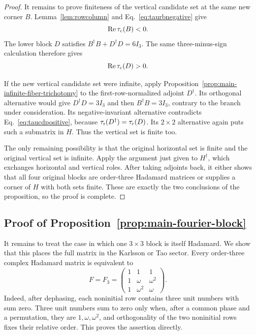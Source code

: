 \begin{proof}
It remains to prove finiteness of the vertical candidate set at the same new corner $B$.  Lemma~\ref{lem:rowcolumn} and Eq.~\eqref{eq:taurbnegative} give
\begin{equation}
\operatorname{Re}\tau_{\rm c}(B)<0.
\label{eq:taucbnegative}
\end{equation}
The lower block $D$ satisfies $B^{\dagger}B+D^{\dagger}D=6I_3$.  The same three-minus-sign calculation therefore gives
\begin{equation}
\operatorname{Re}\tau_{\rm c}(D)>0.
\label{eq:taucdpositive}
\end{equation}

If the new vertical candidate set were infinite, apply Proposition~\ref{prop:main-infinite-fiber-trichotomy} to the first-row-normalized adjoint $D^{\dagger}$. Its orthogonal alternative would give $D^{\dagger}D=3I_3$ and then $B^{\dagger}B=3I_3$, contrary to the branch under consideration.  Its negative-invariant alternative contradicts Eq.~\eqref{eq:taucdpositive}, because $\tau_{\rm r}(D^{\dagger})=\tau_{\rm c}(D)$.  Its $2\times2$ alternative again puts such a submatrix in $H$.  Thus the vertical set is finite too.

The only remaining possibility is that the original horizontal set is finite and the original vertical set is infinite.  Apply the argument just given to $H^{\dagger}$, which exchanges horizontal and vertical roles.  After taking adjoints back, it either shows that all four original blocks are order-three Hadamard matrices or supplies a corner of $H$ with both sets finite. These are exactly the two conclusions of the proposition, so the proof is complete.
\end{proof}

\subsection{{Proof of Proposition~\ref{prop:main-fourier-block}}}
\label{sec:fourierblock}

It remains to treat the case in which one $3\times3$ block is itself Hadamard. We show that this places the full matrix in the Karlsson or Tao sector.
%
Every order-three complex Hadamard matrix is equivalent to
\begin{equation}
F=F_3=\begin{pmatrix}
1&1&1\\
1&\omega&\omega^2\\
1&\omega^2&\omega
\end{pmatrix}.
\label{eq:F3}
\end{equation}
Indeed, after dephasing, each noninitial row contains three unit numbers with sum zero.  Three unit numbers sum to zero only when, after a common phase and a permutation, they are $1,\omega,\omega^2$, and orthogonality of the two noninitial rows fixes their relative order. This proves the assertion directly.

